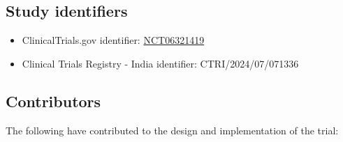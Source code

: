 \documentclass[
]{scrartcl}
\providecommand{\tightlist}{%
  \setlength{\itemsep}{0pt}\setlength{\parskip}{0pt}}\usepackage{longtable,booktabs,array}
\begin{document}
\hypertarget{study-identifiers}{%
\subsection{Study identifiers}\label{study-identifiers}}

\begin{itemize}
\tightlist
\item
  ClinicalTrials.gov identifier:
  \href{https://clinicaltrials.gov/ct2/show/NCT06321419}{NCT06321419}
\item
  Clinical Trials Registry - India identifier: CTRI/2024/07/071336
\end{itemize}

\hypertarget{contributors}{%
\subsection{Contributors}\label{contributors}}

The following have contributed to the design and implementation of the
trial:
\end{document}
